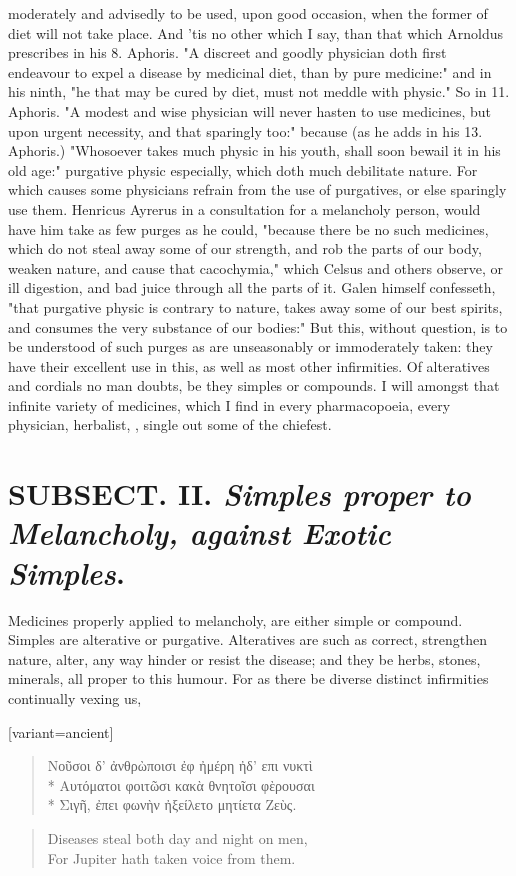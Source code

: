 {moderately and advisedly to be used, upon good occasion, when the former of diet will not take place. And 'tis no other which I say, than that which Arnoldus prescribes in his 8. Aphoris. "A discreet and goodly physician doth first endeavour to expel a disease by medicinal diet, than by pure medicine:" and in his ninth, "he that may be cured by diet, must not meddle with physic." So in 11. Aphoris. "A modest and wise physician will never hasten to use medicines, but upon urgent necessity, and that sparingly too:" because (as he adds in his 13. Aphoris.) "Whosoever takes much physic in his youth, shall soon bewail it in his old age:" purgative physic especially, which doth much debilitate nature. For which causes some physicians refrain from the use of purgatives, or else sparingly use them. Henricus Ayrerus in a consultation for a melancholy person, would have him take as few purges as he could, "because there be no such medicines, which do not steal away some of our strength, and rob the parts of our body, weaken nature, and cause that cacochymia," which Celsus and others observe, or ill digestion, and bad juice through all the parts of it. Galen himself confesseth, "that purgative physic is contrary to nature, takes away some of our best spirits, and consumes the very substance of our bodies:" But this, without question, is to be understood of such purges as are unseasonably or immoderately taken: they have their excellent use in this, as well as most other infirmities. Of alteratives and cordials no man doubts, be they simples or compounds. I will amongst that infinite variety of medicines, which I find in every pharmacopoeia, every physician, herbalist, \etc{}, single out some of the chiefest.

\section{ SUBSECT. II. \emph{Simples proper to Melancholy, against Exotic Simples}.}


Medicines properly applied to melancholy, are either simple or compound. Simples are alterative or purgative. Alteratives are such as correct, strengthen nature, alter, any way hinder or resist the disease; and they be herbs, stones, minerals, \etc{} all proper to this humour. For as there be diverse distinct infirmities continually vexing us,

\begin{greek}[variant=ancient]
\begin{verse}
Νοῦσοι δ' ἀνθρὼποισι ἐφ ἠμέρη ἠδ' επι νυκτὶ\\*
Αυτόματοι φοιτῶσι κακὰ θνητοῖσι φὲρουσαι\\*
Σιγῆ, ἐπει φωνὴν ἠξείλετο μητίετα Ζεὺς.
\end{verse}
\end{greek}
\translationrule%
\begin{verse}
Diseases steal both day and night on men,\\
For Jupiter hath taken voice from them.
\end{verse}

}
